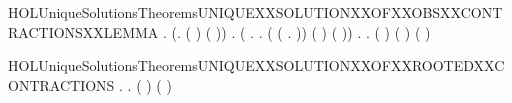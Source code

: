 \begin{SaveVerbatim}{HOLUniqueSolutionsTheoremsUNIQUEXXSOLUTIONXXOFXXOBSXXCONTRACTIONSXXLEMMA}
\HOLTokenTurnstile{} \HOLSymConst{\HOLTokenForall{}} .
       (\HOLSymConst{\HOLTokenExists{}}.   \HOLSymConst{\HOLTokenConj{}}   ( ) \HOLSymConst{\HOLTokenConj{}}   ( )) \HOLSymConst{\HOLTokenImp{}}
       \HOLSymConst{\HOLTokenForall{}}.
             \HOLSymConst{\HOLTokenImp{}}
           (\HOLSymConst{\HOLTokenForall{}} .
                  \HOLTokenWeakTransBegin{} \HOLTokenWeakTransEnd {} \HOLSymConst{\HOLTokenImp{}}
                \HOLSymConst{\HOLTokenExists{}}.
                      \HOLSymConst{\HOLTokenConj{}}     \HOLSymConst{\HOLTokenConj{}}
                    (  (\HOLTokenLambda{} .  \HOLTokenWeakTransBegin{} \HOLTokenWeakTransEnd {})) ( )
                      ( )) \HOLSymConst{\HOLTokenConj{}}
           \HOLSymConst{\HOLTokenForall{}}.
                 \HOLTokenWeakTransBegin\HOLConst{\ensuremath{\tau}}\HOLTokenWeakTransEnd {} \HOLSymConst{\HOLTokenImp{}}
               \HOLSymConst{\HOLTokenExists{}}.
                     \HOLSymConst{\HOLTokenConj{}}     \HOLSymConst{\HOLTokenConj{}}
                   (  ) ( ) ( )
\end{SaveVerbatim}
\newcommand{\HOLUniqueSolutionsTheoremsUNIQUEXXSOLUTIONXXOFXXOBSXXCONTRACTIONSXXLEMMA}{\UseVerbatim{HOLUniqueSolutionsTheoremsUNIQUEXXSOLUTIONXXOFXXOBSXXCONTRACTIONSXXLEMMA}}
\begin{SaveVerbatim}{HOLUniqueSolutionsTheoremsUNIQUEXXSOLUTIONXXOFXXROOTEDXXCONTRACTIONS}
\HOLTokenTurnstile{} \HOLSymConst{\HOLTokenForall{}}.
         \HOLSymConst{\HOLTokenImp{}}
       \HOLSymConst{\HOLTokenForall{}} .
             ( ) \HOLSymConst{\HOLTokenConj{}}   ( ) \HOLSymConst{\HOLTokenImp{}}
             
\end{SaveVerbatim}
